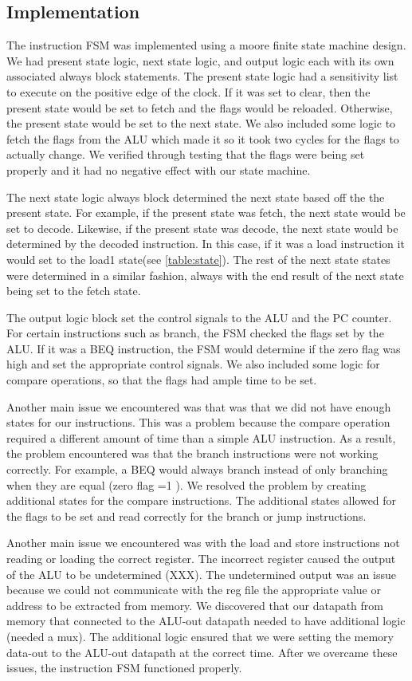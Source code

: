 \documentclass[letterpaper, 11 pt, conference]{article}
\begin{document}
\subsection{Implementation}
The instruction FSM was implemented using a moore finite state machine design. We had present state logic, next state logic, and output logic each with its own associated always block statements. The present state logic had a sensitivity list to execute on the positive edge of the clock. If it was set to clear, then the present state would be set to fetch and the flags would be reloaded. Otherwise, the present state would be set to the next state. We also included some logic to fetch the flags from the ALU which made it so it took two cycles for the flags to actually change. We verified through testing that the flags were being set properly and it had no negative effect with our state machine. 

The next state logic always block determined the next state based off the the present state. For example, if the present state was fetch, the next state would be set to decode. Likewise, if the present state was decode, the next state would be determined by the decoded instruction. In this case, if it was a load instruction it would set to the load1 state(see \ref{table:state}). The rest of the next state states were determined in a similar fashion, always with the end result of the next state being set to the fetch state. 

The output logic block set the control signals to the ALU and the PC counter. For certain instructions such as branch, the FSM checked the flags set by the ALU. If it was a BEQ instruction, the FSM would determine if the zero flag was high and set the appropriate control signals. We also included some logic for compare operations, so that the flags had ample time to be set.
 

Another main issue we encountered was that was that we did not have enough states for our instructions. This was a problem because the compare operation required a different amount of time than a simple ALU instruction. As a result, the problem encountered was that the branch instructions were not working correctly. For example, a BEQ would always branch instead of only branching when they are equal (zero flag =1 ). We resolved the problem by creating additional states for the compare instructions. The additional states allowed for the flags to be set and read correctly for the branch or jump instructions. 

Another main issue we encountered was with the load and store instructions not reading or loading the correct register. The incorrect register caused the output of the ALU to be undetermined (XXX). The undetermined output was an issue because we could not communicate with the reg file the appropriate value or address to be extracted from memory. We discovered that our datapath from memory that connected to the ALU-out datapath needed to have additional logic (needed a mux). The additional logic ensured that we were setting the memory data-out to the ALU-out datapath at the correct time. After we overcame these issues, the instruction FSM functioned properly.
\end{document}
